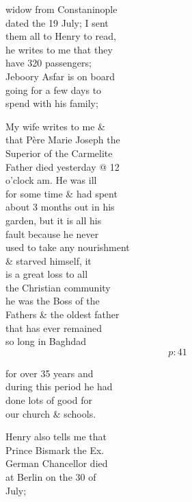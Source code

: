 \documentclass{report}
\begin{document}
	\par{
 	widow from Constaninople\ \\dated the 19 July; I sent\ \\them all to Henry to read,\ \\he writes to me that they\ \\have 320 passengers;\ \\Jeboory Asfar is on board\ \\going for a few days to\ \\spend with his family;\ \\
	}

	\par{
 	My wife writes to me \&\ \\that Père Marie Joseph the\ \\Superior of the Carmelite\ \\Father died yesterday @ 12\ \\o'clock am. He was ill\ \\for some time \& had spent\ \\about 3 months out in his\ \\garden, but it is all his\ \\fault because he never\ \\used to take any nourishment\ \\\& starved himself, it\ \\is a great loss to all\ \\the Christian community\ \\he was the Boss of the\ \\Fathers \& the oldest father\ \\that has ever remained\ \\so long in Baghdad\ \\
  \[p: 41 \]

	}



	\par{
 	for over 35 years and\ \\during this period he had\ \\done lots of good for\ \\our church \& schools.\ \\
	}

	\par{
 	Henry also tells me that\ \\Prince Bismark the Ex.\ \\German Chancellor died\ \\at Berlin on the 30 of\ \\July;\ \\
	}
\end{document}
